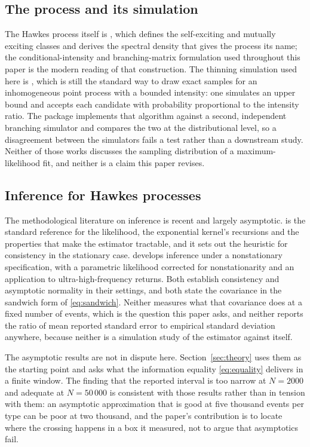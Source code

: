 \subsection{The process and its simulation}

The Hawkes process itself is \citet{hawkes1971}, which defines the self-exciting
and mutually exciting classes and derives the spectral density that gives the
process its name; the conditional-intensity and branching-matrix formulation used
throughout this paper is the modern reading of that construction. The thinning
simulation used here is \citet{ogata1981}, which is still the standard way to draw
exact samples for an inhomogeneous point process with a bounded intensity: one
simulates an upper bound and accepts each candidate with probability proportional
to the intensity ratio. The package implements that algorithm against a second,
independent branching simulator and compares the two at the distributional level,
so a disagreement between the simulators fails a test rather than a downstream
study. Neither of those works discusses the sampling distribution of a
maximum-likelihood fit, and neither is a claim this paper revises.

\subsection{Inference for Hawkes processes}

The methodological literature on inference is recent and largely asymptotic.
\citet{laub2015} is the standard reference for the likelihood, the exponential
kernel's recursions and the properties that make the estimator tractable, and it
sets out the heuristic for consistency in the stationary case. \citet{chen2013}
develops inference under a nonstationary specification, with a parametric
likelihood corrected for nonstationarity and an application to ultra-high-frequency
returns. Both establish consistency and asymptotic normality in their settings, and
both state the covariance in the sandwich form of \eqref{eq:sandwich}. Neither
measures what that covariance does at a fixed number of events, which is the
question this paper asks, and neither reports the ratio of mean reported standard
error to empirical standard deviation anywhere, because neither is a simulation
study of the estimator against itself.

The asymptotic results are not in dispute here. Section~\ref{sec:theory} uses them
as the starting point and asks what the information equality \eqref{eq:equality}
delivers in a finite window. The finding that the reported interval is too narrow at
$N = 2000$ and adequate at $N = 50\,000$ is consistent with those results rather
than in tension with them: an asymptotic approximation that is good at five
thousand events per type can be poor at two thousand, and the paper's contribution
is to locate where the crossing happens in a box it measured, not to argue that
asymptotics fail.

